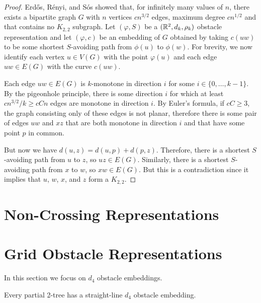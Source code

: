 \documentclass{patmorin}
\begin{document}
\begin{proof}
   Erd\H{o}s, R\'enyi, and S\'os \cite{erdos.renyi.ea:1966} showed that,
   for infinitely many values of $n$, there exists a bipartite graph
   $G$ with $n$ vertices $cn^{3/2}$ edges, maximum degree $cn^{1/2}$
   and that contains no $K_{2,2}$ subgraph.  Let $(\varphi,S)$ be a
   $(\mathbb{R}^2,d_k,\rho_k)$ obstacle representation and let $(\varphi,c)$ be
   an embedding of $G$ obtained by taking $c(uw)$ to be some shortest
   $S$-avoiding path from $\phi(u)$ to $\phi(w)$.  For brevity, we now
   identify each vertex $u\in V(G)$ with the point $\varphi(u)$ and each
   edge $uw\in E(G)$ with the curve $c(uw)$.

   Each edge $uw\in E(G)$ is $k$-monotone in direction $i$ for some
   $i\in\{0,\ldots,k-1\}$.  By the pigeonhole principle, there is
   some direction $i$ for which at least $cn^{3/2}/k\ge cCn$ edges
   are monotone in direction $i$.  By Euler's formula, if $cC\ge 3$,
   the graph consisting only of these edges is not planar, therefore
   there is some pair of edges $uw$ and $xz$ that are both monotone in
   direction $i$ and that have some point $p$ in common.

   But now we have $d(u,z)=d(u,p)+d(p,z)$.  Therefore, there is a shortest
   $S$-avoiding path from $u$ to $z$, so $uz\in E(G)$.  Similarly, there
   is a shortest $S$-avoiding path from $x$ to $w$, so $xw\in E(G)$.
   But this is a contradiction since it implies that $u$, $w$, $x$,
   and $z$ form a $K_{2,2}$.
\end{proof}


\section{Non-Crossing Representations}

\section{Grid Obstacle Representations}

In this section we focus on $d_4$ obstacle embeddings.

\begin{thm}
  Every partial 2-tree has a straight-line $d_4$ obstacle embedding.
\end{thm}
\end{document}
